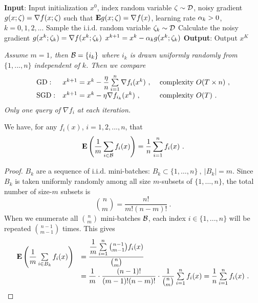 \begin{algorithm}[H]
\caption{Stochastic Gradient Descent}
\label{Alg:SGD}
\begin{algorithmic}[1]
\STATE \textbf{Input}: Input initialization $x^0$, index random variable $\zeta\sim \mathcal D$, noisy gradient $g(x;\zeta)=\nabla f(x;\zeta)$ such that $\mathbf E g(x;\zeta)=\nabla f(x)$, learning rate $\alpha_k>0$, $k=0,1,2,...$
    \STATE Sample the i.i.d. random variable $\zeta_k\sim \mathcal D$
    \STATE Calculate the noisy gradient $g(x^k; \zeta_k)=\nabla f(x^k; \zeta_k)$
    \STATE $x^{k+1}=x^k-\alpha_k g(x^k; \zeta_k)$
\ENDFOR
\STATE \textbf{Output}: Output $x^K$
\end{algorithmic}
\end{algorithm}


\begin{example}
\emph{Assume $m=1$, then $\mathcal B=\{i_k\}$ where $i_k$ is drawn uniformly randomly from $\{1,...,n\}$ independent of $k$. Then we compare
$$\begin{array}{lll}
\text{GD}: &
x^{k+1}
=
x^k
-
\dfrac{\eta}{n}\sum\limits_{i=1}^n \nabla f_i(x^k) \ ,
& 
\text{ complexity } O(T\times n) \ ,
\\
\text{SGD}: &
x^{k+1}=x^k-\eta \nabla f_{i_k}(x^k) \ ,
& \text{ complexity } O(T) \ .
\end{array}$$
Only one query of $\nabla f_i$ at each iteration.}
\end{example}

\begin{lemma}\label{Lm:MinibatchExpectationUnbiased}
We have, for any $f_i(x)$, $i=1,2,...,n$, that
$$\mathbf E\left(\dfrac{1}{m}\sum\limits_{i\in \mathcal B}f_i(x)\right)=\dfrac{1}{n}\sum\limits_{i=1}^n f_i(x) \ .$$
\end{lemma}

\begin{proof}
$B_k$ are a sequence of i.i.d. mini-batches: $B_k \subset \{1,\ldots,n\}
\ , \ 
|B_k|=m$. Since $B_k$ is taken uniformly randomly among all size $m$-subsets of $\{1,\ldots,n\}$, the total number of size-$m$ subsets is $$\binom{n}{m}=\frac{n!}{m!(n-m)!} \ .$$ 
When we enumerate all ${n\choose m}$ mini-batches $\mathcal B$, each index $i\in \{1,...,n\}$ will be repeated $n-1 \choose m-1$ times. 
This gives
$$\begin{array}{ll}
\mathbf E
\left(
\dfrac{1}{m}\sum\limits_{i\in B_k} f_i(x)
\right)
& =
\dfrac{
\dfrac{1}{m}\sum\limits_{i=1}^n \binom{n-1}{m-1} f_i(x)
}{
\binom{n}{m}
}
\\
& =
\dfrac{1}{m}
\cdot
\dfrac{(n-1)!}{(m-1)!(n-m)!}
\cdot
\dfrac{1}{\binom{n}{m}}
\sum\limits_{i=1}^n f_i(x)
=
\dfrac{1}{n}\sum\limits_{i=1}^n f_i(x) \ .
\end{array}$$
\end{proof}


